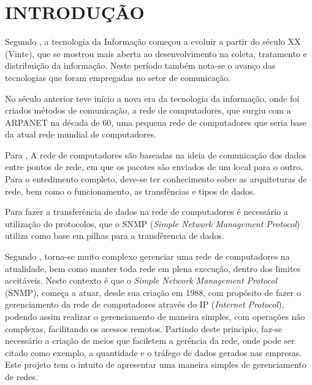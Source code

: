 \chapter*{INTRODUÇÃO}

\par Segundo , a tecnologia da
Informação começou a evoluir a partir do século XX (Vinte), que se mostrou mais
aberta ao desenvolvimento na coleta, tratamento e distribuição da informação. 
Neste período também nota-se o avanço das tecnologias que foram empregadas
no setor de comunicação.

\par No século anterior teve início a nova era da tecnologia da informação, onde
foi criados métodos de comunicação, a rede de computadores, que surgiu com a
ARPANET na década de 60, uma pequena rede de computadores que seria base da
atual rede mundial de computadores.

\par Para , A rede de computadores são baseadas
na ideia de comunicação dos dados entre pontos de rede, em que os pacotes são
enviados de um local para o outro. Para o entedimento completo, deve-se ter
conhecimento sobre as arquiteturas de rede, bem como o funcionamento, as
transfências e tipos de dados.

\par Para fazer a transferência de dados na rede de computadores é necessário a
utilização do protocolos, que o SNMP (\textit{Simple Network Management
Protocol}) utiliza como base em pilhas para a transfêrencia de dados.


\par Segundo , torna-se muito complexo
gerenciar uma rede de computadores na atualidade, bem como manter toda rede em
plena execução, dentro dos limites aceitáveis. Neste contexto é que o 
\textit{Simple Network Management Protocol} (SNMP), começa a atuar,
desde sua criação em 1988, com propósito de fazer o gerenciamento da rede de
computadores através do IP (\textit{Internet Protocol}), podendo assim realizar
o gerenciamento de maneira simples, com operações não complexas, facilitando os acessos remotos.
Partindo deste principio, faz-se necessário a criação de meios que faciletem a gerência da rede,
 onde pode ser citado como exemplo, a quantidade e o tráfego de dados gerados nas
empresas. Este projeto tem o intuito de apresentar uma maneira simples de gerenciamento de
redes.

